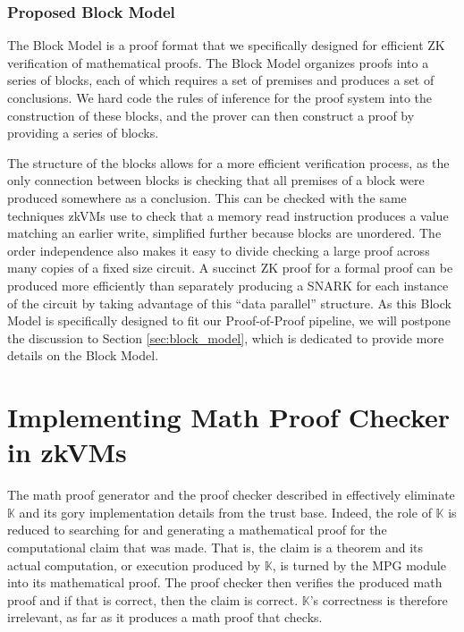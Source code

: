\documentclass{article}
\theoremstyle{plain}
\theoremstyle{definition}
\newcommand{\K}{$\mathbb{K}$\xspace}
\begin{document}
\subsubsection{Proposed Block Model}

The Block Model is a proof format that we specifically designed for efficient ZK verification of mathematical proofs. The Block Model organizes proofs into a series of blocks, each of which requires a set of premises and produces a set of conclusions. We hard code the rules of inference for the proof system into the construction of these blocks, and the prover can then construct a proof by providing a series of blocks.

The structure of the blocks allows for a more efficient verification process, as the only connection between blocks is checking that all premises of a block were produced somewhere as a conclusion.
This can be checked with the same techniques zkVMs use to check that a memory read instruction produces a value matching an earlier write, simplified further because blocks are unordered.
The order independence also makes it easy to divide checking a large proof across many copies of a fixed size circuit.
A succinct ZK proof for a formal proof can be produced more efficiently than separately producing a
SNARK for each instance of the circuit by taking advantage of this ``data parallel'' structure.
As this Block Model is specifically designed to fit our Proof-of-Proof pipeline, we will postpone the discussion to Section \ref{sec:block_model}, which is dedicated to provide more details on the Block Model.

\section{Implementing Math Proof Checker in zkVMs}
\label{sec:zkVMs}


The math proof generator and the proof checker described in  effectively eliminate \K and its gory implementation details from the trust base.  Indeed, the role of \K is reduced to searching for and generating a mathematical proof for the computational claim that was made.  That is, the claim is a theorem and its actual computation, or execution produced by \K, is turned by the MPG module into its mathematical proof.  The proof checker then verifies the produced math proof and if that is correct, then the claim is correct. \K's correctness is therefore irrelevant, as far as it produces a math proof that checks.
\end{document}
